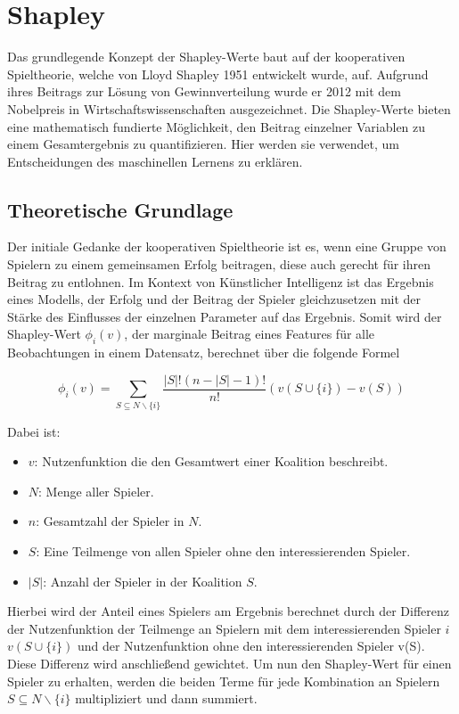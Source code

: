 \documentclass[12pt,titlepage,oneside]{book}
\begin{document}
\newpage
\section{Shapley} \label{shapley}
Das grundlegende Konzept der Shapley-Werte baut auf der kooperativen Spieltheorie, welche von Lloyd Shapley 1951 entwickelt wurde, auf. Aufgrund ihres Beitrags zur Lösung von Gewinnverteilung wurde er 2012 mit dem Nobelpreis in Wirtschaftswissenschaften ausgezeichnet. Die Shapley-Werte bieten eine mathematisch fundierte Möglichkeit, den Beitrag einzelner Variablen zu einem Gesamtergebnis zu quantifizieren. Hier werden sie verwendet, um Entscheidungen des maschinellen Lernens zu erklären.

\subsection{Theoretische Grundlage}
Der initiale Gedanke der kooperativen Spieltheorie ist es, wenn eine Gruppe von Spielern zu einem gemeinsamen Erfolg beitragen, diese auch gerecht für ihren Beitrag zu entlohnen. Im Kontext von Künstlicher Intelligenz ist das Ergebnis eines Modells, der Erfolg und der Beitrag der Spieler gleichzusetzen mit der Stärke des Einflusses der einzelnen Parameter auf das Ergebnis. Somit wird der Shapley-Wert $\phi_i(v)$, der marginale Beitrag eines Features für alle Beobachtungen in einem Datensatz, berechnet über die folgende Formel

\begin{equation} \label{shapleyformel}
\phi_i(v)= \sum_{S \subseteq N \backslash\{i\}} \frac{|S|!(n-|S|-1)!}{n!}(v(S \cup\{i\})-v(S))
\end{equation}

Dabei ist:
\begin{itemize}
    \item \textbf{\( v \)}: Nutzenfunktion die den Gesamtwert einer Koalition beschreibt.
    \item \textbf{\( N \)}: Menge aller Spieler.
    \item \textbf{\( n \)}: Gesamtzahl der Spieler in \( N \).
    \item \textbf{\( S \)}: Eine Teilmenge von allen Spieler ohne den interessierenden Spieler.
    \item \textbf{\( |S| \)}: Anzahl der Spieler in der Koalition \( S \).
\end{itemize}


Hierbei wird der Anteil eines Spielers am Ergebnis berechnet durch der Differenz der Nutzenfunktion der Teilmenge an Spielern mit dem interessierenden Spieler $i$ $v(S \cup\{i\})$ und der Nutzenfunktion ohne den interessierenden Spieler v(S). Diese Differenz wird anschließend gewichtet.
Um nun den Shapley-Wert für einen Spieler zu erhalten, werden die beiden Terme für jede Kombination an Spielern $S \subseteq N \backslash\{i\}$ multipliziert und dann summiert. 
\end{document}
